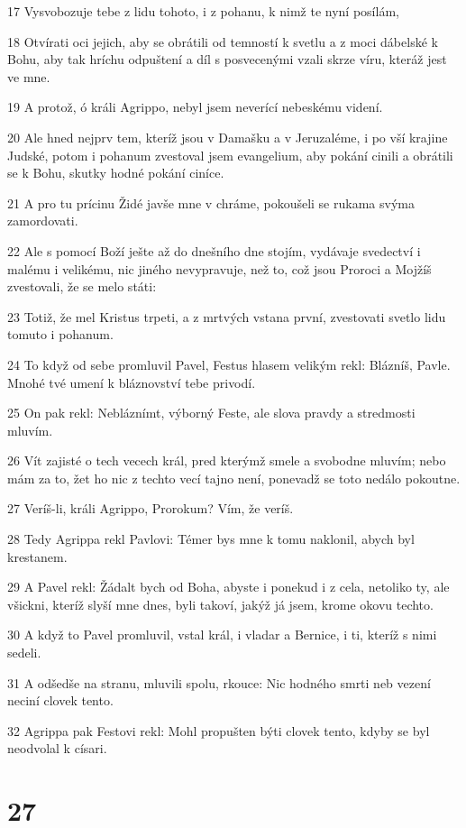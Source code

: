 \par 17 Vysvobozuje tebe z lidu tohoto, i z pohanu, k nimž te nyní posílám,
\par 18 Otvírati oci jejich, aby se obrátili od temností k svetlu a z moci dábelské k Bohu, aby tak hríchu odpuštení a díl s posvecenými vzali skrze víru, kteráž jest ve mne.
\par 19 A protož, ó králi Agrippo, nebyl jsem neverící nebeskému videní.
\par 20 Ale hned nejprv tem, kteríž jsou v Damašku a v Jeruzaléme, i po vší krajine Judské, potom i pohanum zvestoval jsem evangelium, aby pokání cinili a obrátili se k Bohu, skutky hodné pokání ciníce.
\par 21 A pro tu prícinu Židé javše mne v chráme, pokoušeli se rukama svýma zamordovati.
\par 22 Ale s pomocí Boží ješte až do dnešního dne stojím, vydávaje svedectví i malému i velikému, nic jiného nevypravuje, než to, což jsou Proroci a Mojžíš zvestovali, že se melo státi:
\par 23 Totiž, že mel Kristus trpeti, a z mrtvých vstana první, zvestovati svetlo lidu tomuto i pohanum.
\par 24 To když od sebe promluvil Pavel, Festus hlasem velikým rekl: Blázníš, Pavle. Mnohé tvé umení k bláznovství tebe privodí.
\par 25 On pak rekl: Nebláznímt, výborný Feste, ale slova pravdy a stredmosti mluvím.
\par 26 Vít zajisté o tech vecech král, pred kterýmž smele a svobodne mluvím; nebo mám za to, žet ho nic z techto vecí tajno není, ponevadž se toto nedálo pokoutne.
\par 27 Veríš-li, králi Agrippo, Prorokum? Vím, že veríš.
\par 28 Tedy Agrippa rekl Pavlovi: Témer bys mne k tomu naklonil, abych byl krestanem.
\par 29 A Pavel rekl: Žádalt bych od Boha, abyste i ponekud i z cela, netoliko ty, ale všickni, kteríž slyší mne dnes, byli takoví, jakýž já jsem, krome okovu techto.
\par 30 A když to Pavel promluvil, vstal král, i vladar a Bernice, i ti, kteríž s nimi sedeli.
\par 31 A odšedše na stranu, mluvili spolu, rkouce: Nic hodného smrti neb vezení neciní clovek tento.
\par 32 Agrippa pak Festovi rekl: Mohl propušten býti clovek tento, kdyby se byl neodvolal k císari.

\chapter{27}

